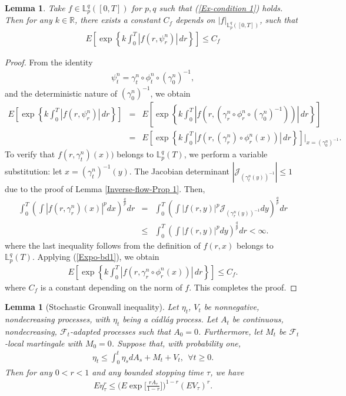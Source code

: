 \documentclass[12pt,oneside, reqno]{amsart}
\newcommand{\be}{\begin{eqnarray}}
\newcommand{\ee}{\end{eqnarray}}
\newcommand{\ce}{\begin{eqnarray*}}
\newcommand{\de}{\end{eqnarray*}}
\newtheorem{lemma}[theorem]{Lemma}
\def\cJ{{\mathcal J}}
\def\mL{{\mathbb L}}
\def\mR{{\mathbb R}}
\def\sF{{\mathscr F}}
\def\geq{\geqslant}
\def\leq{\leqslant}
\numberwithin{equation}{section}
\begin{document}
\begin{lemma}\label{expolencial-bdd-1}
	Take $f\in \mL_p^q([0,T])$ for $p,q$ such that (\ref{Ex-condition 1}) holds. Then
	for any $k\in \mR$, there exists a constant $C_f$ depends  on $|f|_{\mL_p^q([0,T])}$, such that 
	\ce 
	E\left [\exp\left\{k\int_0^T |f(r,\psi_r^n)|\,dr\right \}\right]\leq C_f
	\de 
\end{lemma}
\begin{proof}
	From the identity
	\ce 
	\psi_t^n=\gamma_t^n\circ\phi_t^n\circ (\gamma_0^n)^{-1},
	\de 
	and the deterministic nature of $(\gamma_0^n)^{-1}$, we obtain 
	\ce 
	E\left [\exp\left\{k\int_0^T |f(r,\psi_r^n)|\,dr\right \}\right]
	&=&E\left [\exp\left\{k\int_0^T |f(r,(\gamma_r^n\circ\phi_r^n\circ (\gamma_0^n)^{-1}))|\,dr\right \}\right]\\
	&=&E\left [\exp\left\{k\int_0^T |f(r,(\gamma_r^n)\circ\phi_r^n(x))|\,dr\right \}\right]\bigg|_{x=(\gamma_0^n)^{-1}}.
	\de 
	To verify that  $f(r,\gamma_t^n)(x))$ belongs to $\mL_p^q(T)$, we perform a variable substitution: let $x=(\gamma_t^n)^{-1}(y)$. The Jacobian determinant $|\cJ_{(\gamma_t^n(y))^{-1}}|\leq 1$ due to the proof  of Lemma \ref{Inverse-flow-Prop 1}. Then,
	\ce 
	\int_0^T\left(\int |f(r,\gamma_r^n)(x)|^pdx\right)^{\frac{q}{p}}dr
	&=&\int_0^T\left(\int |f(r,y)|^p\cJ_{(\gamma_r^n(y))^{-1}}dy\right)^{\frac{q}{p}}dr\\
	&\leq&\int_0^T\left(\int |f(r,y)|^pdy\right)^{\frac{q}{p}}dr
	<\infty.
	\de 
	where the last inequality follows from the definition of $f(r,x)$ belongs to $\mL_p^q(T)$. Applying (\ref{Expo-bd1}), we obtain
	\ce 
	E\left [\exp\left\{k\int_0^T |f(r,\gamma_r^n\circ\phi_r^n(x))|\,dr\right \}\right]\leq C_f.
	\de 
	where $C_f$ is a constant depending on the norm of $f$.  This completes the proof.
\end{proof}


\begin{lemma}[Stochastic Gronwall inequality]\label{Stochastic Gronwall inequality}
	Let $\eta_t$, $V_t$ be nonnegative, nondecreasing processes, with $\eta_t$ being a c\'{a}dl\'{a}g process. Let $A_t$ be continuous, nondecreasing,  $\sF_t$-adapted processes such that $A_0=0$. Furthermore, let $M_t$ be $\sF_t$-local martingale with $M_0=0$. Suppose that, with probability one,
	\be \label{Stochastic Gronwall inequality1}
	\eta_t\leq \int_0^t\eta_sdA_s+M_t+V_t,~~\forall t\geq 0.
	\ee
	Then for any $0<r<1$ and  any bounded stopping time $\tau$, we have 
	\ce 
	E \eta_{\tau}^r\leq \bigg(E \exp\bigg[\frac{rA_\tau}{1-r}\bigg]\bigg)^{1-r}(E V_{\tau})^r.
	\de 
\end{lemma}
\end{document}
